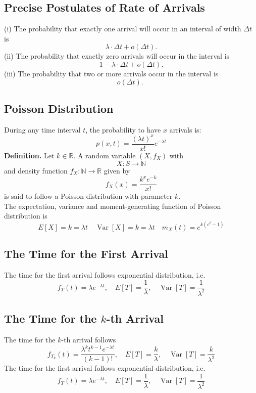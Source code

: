\documentclass[a4paper,12pt]{article}
\begin{document}
    \subsection{Precise Postulates of Rate of Arrivals}
    (i) The probability that exactly one arrival will occur in an interval of width $\Delta t$ is
$$
\lambda \cdot \Delta t+o(\Delta t) .
$$
(ii) The probability that exactly zero arrivals will occur in the interval is
$$
1-\lambda \cdot \Delta t+o(\Delta t) .
$$
(iii) The probability that two or more arrivals occur in the interval is
$$
o(\Delta t) \text {. }
$$
    \subsection{Poisson Distribution}
    During any time interval $t$, the probability to have $x$ arrivals is:
    \begin{equation}
        p(x,t)=\dfrac{(\lambda t)^x}{x !} e^{-\lambda t}
        \end{equation}
        \textbf{Definition.} Let $k \in \mathbb{R}$. A random variable $\left(X, f_X\right)$ with
$$
X: S \rightarrow \mathbb{N}
$$
and density function $f_X: \mathbb{N} \rightarrow \mathbb{R}$ given by
\begin{equation}
    f_X(x)=\dfrac{k^x e^{-k}}{x !}
\end{equation}
is said to follow a Poisson distribution with parameter $k$.\\
The expectation, variance and moment-generating function of Poisson distribution is
$$
    E[X]=k=\lambda t \quad \operatorname{Var}[X]=k=\lambda t \quad m_X(t)=e^{k\left(e^t-1\right)}
$$

\subsection{The Time for the First Arrival}
The time for the first arrival follows exponential distribution, i.e.
$$
f_T(t)=\lambda e^{-\lambda t}, \quad E[T]=\dfrac{1}{\lambda}, \quad \operatorname{Var}[T]=\dfrac{1}{\lambda^2}
$$
\subsection{The Time for the $k$-th Arrival}
The time for the $k$-th arrival follows
$$
f_{T_k}(t)=\dfrac{\lambda^k t^{k-1}e^{-\lambda t}}{(k-1)!}, \quad E[T]=\dfrac{k}{\lambda}, \quad \operatorname{Var}[T]=\dfrac{k}{\lambda^2}
$$
The time for the first arrival follows exponential distribution, i.e.
$$
f_T(t)=\lambda e^{-\lambda t}, \quad E[T]=\dfrac{1}{\lambda}, \quad \operatorname{Var}[T]=\dfrac{1}{\lambda^2}
$$
\end{document}

